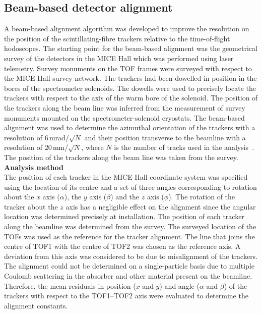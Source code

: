 
\subsection{Beam-based detector alignment}
\label{SubSect:DA}

A beam-based alignment algorithm was developed to improve the
resolution on the position of the scintillating-fibre trackers
relative to the time-of-flight hodoscopes.
The starting point for the beam-based alignment was the geometrical
survey of the detectors in the MICE Hall which was performed using
laser telemetry. 
Survey monuments on the TOF frames were surveyed with respect to the
MICE Hall survey network.
The trackers had been dowelled in position in the bores of the
spectrometer solenoids.
The dowells were used to precisely locate the trackers with respect to
the axis of the warm bore of the solenoid.
The position of the trackers along the beam line was inferred from the
measurement of survey monuments mounted on the spectrometer-solenoid
cryostats.
The beam-based alignment was used to determine the azimuthal
orientation of the trackers with a resolution of 6\,mrad/$\sqrt{N}$
and their position transverse to the beamline with a resolution of
20\,mm/$\sqrt{N}$, where $N$ is the number of tracks used in the
analysis~\cite{2018arXiv1805.06623T}.
The position of the trackers along the beam line was taken from the
survey. \\

\noindent\textbf{Analysis method} \\
\label{SubSect:DA_Analysis}
\noindent The position of each tracker in the MICE Hall coordinate
system was specified using the location of its centre and a set of
three angles corresponding to rotation about the $x$ axis ($\alpha$),
the $y$ axis ($\beta$) and the $z$ axis ($\phi$).
The rotation of the tracker about the $z$ axis has a negligible effect
on the alignment since the angular location was determined precisely
at installation.
The position of each tracker along the beamline was determined from
the survey.
The surveyed location of the TOFs was used as the reference for the
tracker alignment.
The line that joins the centre of TOF1 with the centre of TOF2 was
chosen as the reference axis.
A deviation from this axis was considered to be due to misalignment
of the trackers.
The alignment could not be determined on a single-particle basis due
to multiple Coulomb scattering in the absorber and other material
present on the beamline.
Therefore, the mean residuals in position ($x$ and $y$) and angle
($\alpha$ and $\beta$) of the trackers with respect to the TOF1--TOF2
axis were evaluated to determine the alignment constants.

